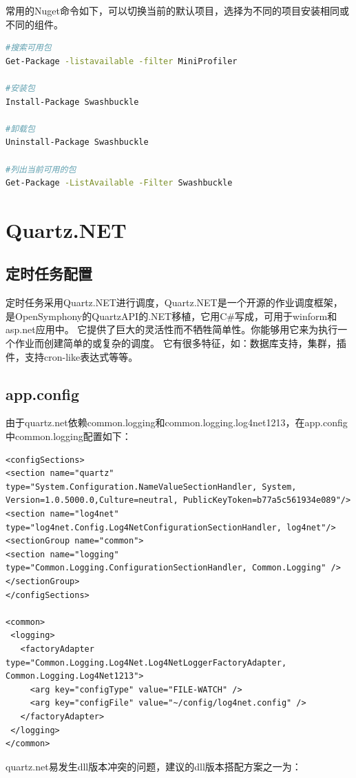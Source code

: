 \documentclass{book}
\begin{document}
常用的Nuget命令如下，可以切换当前的默认项目，选择为不同的项目安装相同或不同的组件。

\begin{lstlisting}[language=Bash]
#搜索可用包
Get-Package -listavailable -filter MiniProfiler

#安装包
Install-Package Swashbuckle

#卸载包
Uninstall-Package Swashbuckle

#列出当前可用的包
Get-Package -ListAvailable -Filter Swashbuckle
\end{lstlisting}


\section{Quartz.NET}

\subsection{定时任务配置}

定时任务采用Quartz.NET进行调度，Quartz.NET是一个开源的作业调度框架，
是OpenSymphony的QuartzAPI的.NET移植，它用C\#写成，可用于winform和asp.net应用中。
它提供了巨大的灵活性而不牺牲简单性。你能够用它来为执行一个作业而创建简单的或复杂的调度。
它有很多特征，如：数据库支持，集群，插件，支持cron-like表达式等等。

\subsection{app.config}
由于quartz.net依赖common.logging和common.logging.log4net1213，在app.config中common.logging配置如下：
\begin{lstlisting}
<configSections>
<section name="quartz" type="System.Configuration.NameValueSectionHandler, System, Version=1.0.5000.0,Culture=neutral, PublicKeyToken=b77a5c561934e089"/>
<section name="log4net" type="log4net.Config.Log4NetConfigurationSectionHandler, log4net"/>
<sectionGroup name="common">
<section name="logging" type="Common.Logging.ConfigurationSectionHandler, Common.Logging" />
</sectionGroup>
</configSections>

<common>
 <logging>
   <factoryAdapter type="Common.Logging.Log4Net.Log4NetLoggerFactoryAdapter, Common.Logging.Log4Net1213">
     <arg key="configType" value="FILE-WATCH" />
     <arg key="configFile" value="~/config/log4net.config" />
   </factoryAdapter>
 </logging>
</common>
\end{lstlisting}

quartz.net易发生dll版本冲突的问题，建议的dll版本搭配方案之一为：
\end{document}

